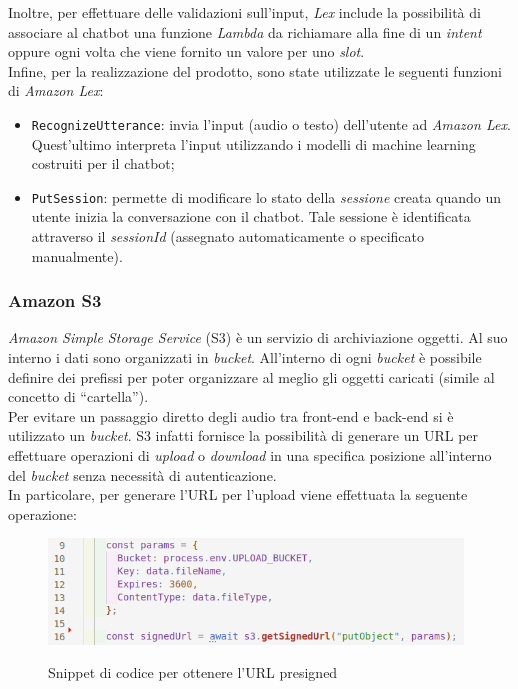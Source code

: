 		\noindent Inoltre, per effettuare delle validazioni sull'input, \emph{Lex} include la possibilità di associare al \gls{chatbot} una funzione \emph{Lambda} da richiamare alla fine di un \emph{intent} oppure ogni volta che viene fornito un valore per uno \emph{slot}. \\
		
		\noindent Infine, per la realizzazione del prodotto, sono state utilizzate le seguenti funzioni di \emph{Amazon Lex}:
		\begin{itemize}
			\item \texttt{RecognizeUtterance}: invia l'input (audio o testo) dell'utente ad \emph{Amazon Lex}. Quest'ultimo interpreta l'input utilizzando i modelli di machine learning costruiti per il \gls{chatbot};
			
			\item \texttt{PutSession}: permette di modificare lo stato della \emph{sessione} creata quando un utente inizia la conversazione con il \gls{chatbot}. Tale sessione è identificata attraverso il \emph{sessionId} (assegnato automaticamente o specificato manualmente). 
		\end{itemize}
		
		\subsubsection{Amazon S3}
		\emph{Amazon Simple Storage Service} (S3) è un servizio di archiviazione oggetti. Al suo interno i dati sono 
		organizzati in \emph{bucket}. All'interno di ogni \emph{bucket} è possibile definire dei prefissi per poter 
		organizzare al meglio gli oggetti caricati (simile al concetto di ``cartella''). \\ 
		Per evitare un passaggio diretto degli audio tra front-end e back-end si è utilizzato un \emph{bucket}. S3 
		infatti fornisce la possibilità di generare un URL per effettuare operazioni di \emph{upload} o 
		\emph{download} in una specifica posizione all'interno del \emph{bucket} senza necessità di autenticazione. \\ 
		In particolare, per generare l'URL per l'upload viene effettuata la seguente operazione:
		
		\begin{figure}[H]
			\centering
			\includegraphics[width=11cm]{immagini/getURL.png} \\
			\caption{\label{fig:getURLAudio} Snippet di codice per ottenere l'URL presigned}
		\end{figure}
		
